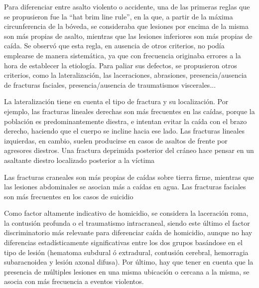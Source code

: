 Para diferenciar entre asalto violento o accidente, una de las primeras reglas que se propusieron fue la “hat brim line rule”, en la que, a partir de la máxima circunferencia de la bóveda, se consideraba que lesiones por encima de la misma son más propias de asalto, mientras que las lesiones inferiores son más propias de caída. Se observó que esta regla, en ausencia de otros criterios, no podía emplearse de manera sistemática, ya que con frecuencia originaba errores a la hora de establecer la etiología. Para paliar sus defectos, se propusieron otros criterios, como la lateralización, las laceraciones, abrasiones, presencia/ausencia de fracturas faciales, presencia/ausencia de traumatismos viscerales...

La lateralización tiene en cuenta el tipo de fractura y su localización. Por ejemplo, las fracturas lineales derechas son más frecuentes en las caídas, porque la población es predominantemente diestra, e intentan evitar la caída con el brazo derecho, haciendo que el cuerpo se incline hacia ese lado. Las fracturas lineales izquierdas, en cambio, suelen producirse en casos de asaltos de frente por agresores diestros. Una fractura deprimida posterior del cráneo hace pensar en un asaltante diestro localizado posterior a la víctima\cite{Kranioti2015}

Las fracturas craneales son más propias de caídas sobre tierra firme, mientras que las lesiones abdominales se asocian más a caídas en agua. Las fracturas faciales son más frecuentes en los casos de suicidio\cite{Kranioti2015}

Como factor altamente indicativo de homicidio, se considera la laceración roma, la contusión profunda o el traumatismo intracraneal, siendo este último el factor discriminatorio más relevante para diferenciar caída de homicidio, aunque no hay diferencias estadísticamente significativas entre los dos grupos basándose en el tipo de lesión (hematoma subdural ó extradural, contusión cerebral, hemorragia subaracnoidea y lesión axonal difusa)\cite{Kranioti2015}. Por último, hay que tener en cuenta que la presencia de múltiples lesiones en una misma ubicación o cercana a la misma, se asocia con más frecuencia a eventos violentos.

